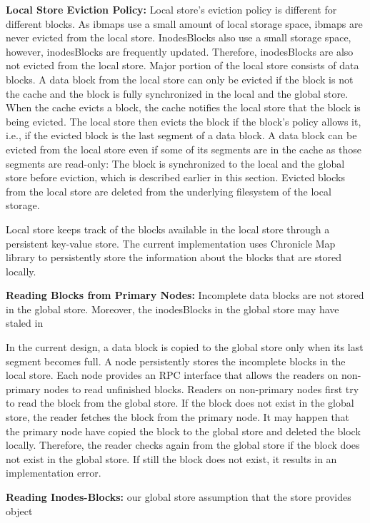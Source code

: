 \documentclass[]{article}
\newcommand{\subtopic}[1]{\vspace{1.5pt} \noindent \textbf{#1}}
\begin{document}
\subtopic{Local Store Eviction Policy:} Local store's eviction policy is
different for different blocks. As ibmaps use a small amount of local storage
space, ibmaps are never evicted from the local store. InodesBlocks also use a
small storage space, however, inodesBlocks are frequently updated. Therefore,
inodesBlocks are also not evicted from the local store. Major portion of the
local store consists of data blocks.  A data block from the local store can
only be evicted if the block is not the cache and the block is fully
synchronized in the local and the global store.  When the cache evicts a block,
the cache notifies the local store that the block is being evicted. The local
store then evicts the block if the block's policy allows it, i.e., if the
evicted block is the last segment of a data block.  A data block can be evicted
from the local store even if some of its segments are in the cache as those
segments are read-only: The block is synchronized to the local and the global
store before eviction, which is described earlier in this section.
Evicted blocks from the local store are deleted from the underlying filesystem
of the local storage. 

Local store keeps track of the blocks available in the local store through a
persistent key-value store. The current implementation uses Chronicle Map
library to persistently store the information about the blocks that are stored
locally.


\subtopic{Reading Blocks from Primary Nodes:} 
Incomplete data blocks are not stored in the global store. Moreover, the
inodesBlocks in the global store may have staled in 


In the current design, a data block
is copied to the global store only when its last segment becomes full. A node
persistently stores the incomplete blocks in the local store. Each node
provides an RPC interface that allows the readers on non-primary nodes to read
unfinished blocks. Readers on non-primary nodes first try to read the block
from the global store.  If the block does not exist in the global store, the
reader fetches the block from the primary node. It may happen that the primary
node have copied the block to the global store and deleted the block locally.
Therefore, the reader checks again from the global store if the block does not
exist in the global store. If still the block does not exist, it results in an
implementation error.


\subtopic{Reading Inodes-Blocks:} 
our global store assumption that the store provides object
\end{document}
